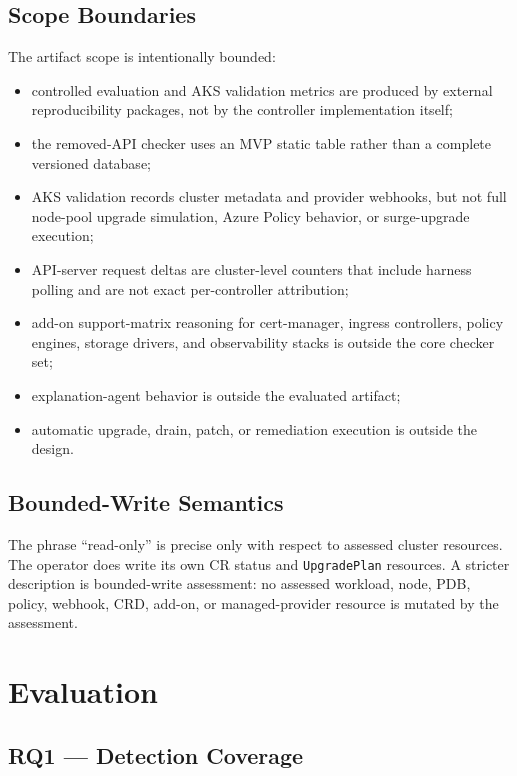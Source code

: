 \documentclass[10pt,journal]{IEEEtran}
\newcommand{\crd}[1]{\texttt{#1}}
\begin{document}
\subsection{Scope Boundaries}
The artifact scope is intentionally bounded:
\begin{itemize}[leftmargin=*]
  \item controlled evaluation and AKS validation metrics are produced by external reproducibility packages, not by the controller implementation itself;
  \item the removed-API checker uses an MVP static table rather than a complete versioned database;
  \item AKS validation records cluster metadata and provider webhooks, but not full node-pool upgrade simulation, Azure Policy behavior, or surge-upgrade execution;
  \item API-server request deltas are cluster-level counters that include harness polling and are not exact per-controller attribution;
  \item add-on support-matrix reasoning for cert-manager, ingress controllers, policy engines, storage drivers, and observability stacks is outside the core checker set;
  \item explanation-agent behavior is outside the evaluated artifact;
  \item automatic upgrade, drain, patch, or remediation execution is outside the design.
\end{itemize}

\subsection{Bounded-Write Semantics}
The phrase ``read-only'' is precise only with respect to assessed cluster resources. The operator does write its own CR status and \crd{UpgradePlan} resources. A stricter description is bounded-write assessment: no assessed workload, node, PDB, policy, webhook, CRD, add-on, or managed-provider resource is mutated by the assessment.

\section{Evaluation}\label{sec:evaluation}

\subsection{RQ1 --- Detection Coverage}\label{sec:rq1}
\end{document}
